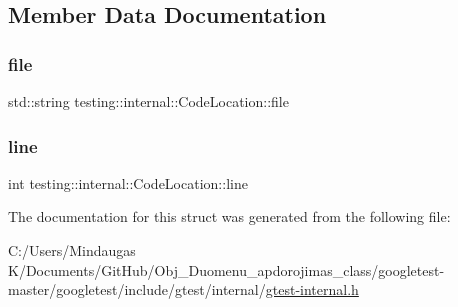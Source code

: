 \subsection{Member Data Documentation}
\mbox{\label{structtesting_1_1internal_1_1_code_location_a38118056ad3c11359920274e393bc6b3}} 
\subsubsection{\texorpdfstring{file}{file}}
{\footnotesize\ttfamily std\+::string testing\+::internal\+::\+Code\+Location\+::file}

\mbox{\label{structtesting_1_1internal_1_1_code_location_a01c977c7e8834a05a6d6c40b0c416045}} 
\subsubsection{\texorpdfstring{line}{line}}
{\footnotesize\ttfamily int testing\+::internal\+::\+Code\+Location\+::line}



The documentation for this struct was generated from the following file\+:\begin{DoxyCompactItemize}
\item 
C\+:/\+Users/\+Mindaugas K/\+Documents/\+Git\+Hub/\+Obj\+\_\+\+Duomenu\+\_\+apdorojimas\+\_\+class/googletest-\/master/googletest/include/gtest/internal/\mbox{\hyperlink{googletest-master_2googletest_2include_2gtest_2internal_2gtest-internal_8h}{gtest-\/internal.\+h}}\end{DoxyCompactItemize}
